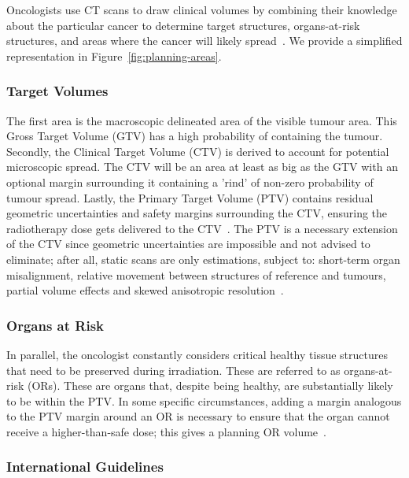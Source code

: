 \documentclass[11pt,twoside]{report}
\begin{document}
Oncologists use CT scans to draw clinical volumes by combining their knowledge about the particular cancer to determine target structures, organs-at-risk structures, and areas where the cancer will likely spread~\cite{AMLART-data}. We provide a simplified representation in Figure~\ref{fig:planning-areas}.

\subsubsection{Target Volumes}

The first area is the macroscopic delineated area of the visible tumour area. This Gross Target Volume (GTV) has a high probability of containing the tumour. Secondly, the Clinical Target Volume (CTV) is derived to account for potential microscopic spread. The CTV will be an area at least as big as the GTV with an optional margin surrounding it containing a 'rind' of non-zero probability of tumour spread. Lastly, the Primary Target Volume (PTV) contains residual geometric uncertainties and safety margins surrounding the CTV, ensuring the radiotherapy dose gets delivered to the CTV~\cite{Lin2021-oz,tumor-delineation,defining-target-volumes,personalised-PTV-strategies}. The PTV is a necessary extension of the CTV since geometric uncertainties are impossible and not advised to eliminate; after all, static scans are only estimations, subject to: short-term organ misalignment, relative movement between structures of reference and tumours, partial volume effects and skewed anisotropic resolution~\cite{VANHERK200452}.

\subsubsection{Organs at Risk}

In parallel, the oncologist constantly considers critical healthy tissue structures that need to be preserved during irradiation. These are referred to as organs-at-risk (ORs). These are organs that, despite being healthy, are substantially likely to be within the PTV. In some specific circumstances, adding a margin analogous to the PTV margin around an OR is necessary to ensure that the organ cannot receive a higher-than-safe dose; this gives a planning OR volume~\cite{defining-target-volumes}.

\subsubsection{International Guidelines}
\end{document}
